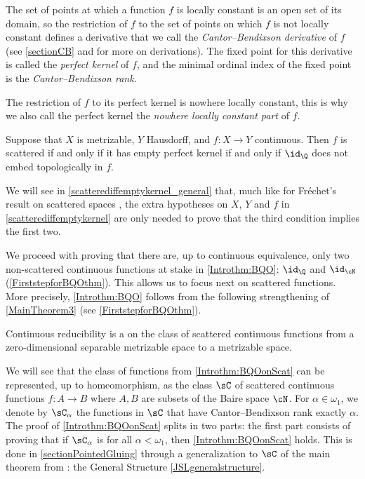 The set of points at which a function $f$ is locally constant is an open set of its domain, so the restriction of $f$ to the set of points on which $f$ is not locally constant defines a derivative
 that we call the \emph{Cantor--Bendixson derivative} of $f$ (see \cref{sectionCB} and \cite[Section 34.D]{kechris} for more on derivations).
The fixed point for this derivative is called the \emph{perfect kernel} of $f$, and the minimal ordinal index of the fixed point is the \emph{Cantor--Bendixson rank}.

The restriction of $f$ to its perfect kernel is nowhere locally constant, this is why we also call the perfect kernel the \emph{nowhere locally constant part} of $f$.

\begin{theorem}\label{scatterediffemptykernel}
Suppose that $X$ is metrizable, $Y$ Hausdorff, and $f:X\to Y$ continuous.
Then $f$ is scattered if and only if it has empty perfect kernel if and only if $\id_\Q$ does not embed topologically in $f$.
\end{theorem}


We will see in \cref{scatterediffemptykernel_general} that, much like for Fréchet's result on scattered spaces \cite{Frechet1927},
the extra hypotheses on $X$, $Y$ and $f$ in \cref{scatterediffemptykernel} are only needed to prove that the third condition implies the first two.


We proceed with proving that there are, up to continuous equivalence, only two non-scattered continuous functions at stake in \cref{Introthm:BQO}:
$\id_\Q$ and $\id_{\cN}$ (\cref{FirststepforBQOthm}).
This allows us to focus next on scattered functions. More precisely, \cref{Introthm:BQO} follows from the following strengthening of \cref{MainTheorem3} (see \cref{FirststepforBQOthm}).

\begin{theorem}\label{Introthm:BQOonScat}
Continuous reducibility is a \bqo{} on the class of scattered continuous functions from a zero-dimensional separable metrizable space to a metrizable space.
\end{theorem}

We will see that the class of functions from \cref{Introthm:BQOonScat} can be represented, up to homeomorphism, as the class $\sC$ of scattered continuous functions $f:A\to B$ where $A,B$ are subsets of the Baire space $\cN$. 
For $\alpha\in\omega_1$, we denote by $\sC_\alpha$ the functions in $\sC$ that have Cantor--Bendixson rank exactly $\alpha$.
The proof of \cref{Introthm:BQOonScat} splits in two parts:
the first part consists of proving that if $\sC_\alpha$ is \bqo{} for all $\alpha<\omega_1$, then \cref{Introthm:BQOonScat} holds.
This is done in \cref{sectionPointedGluing} through a generalization to $\sC$ of the main theorem from \cite{carroy2013quasi}: the General Structure \cref{JSLgeneralstructure}.

